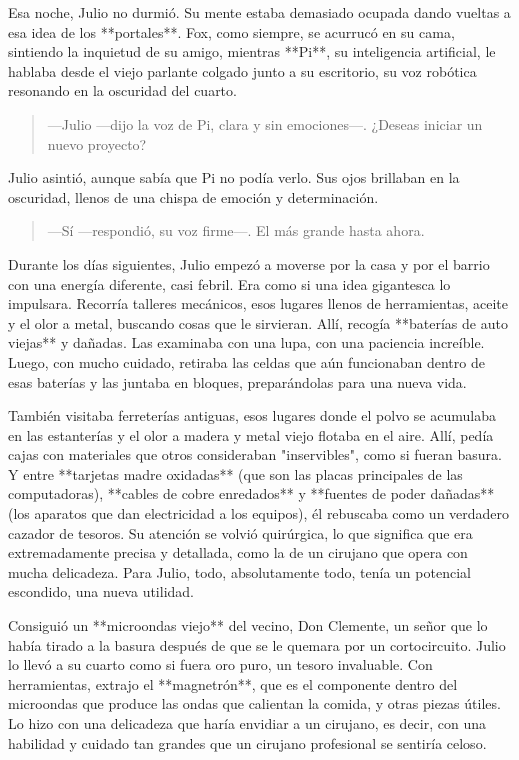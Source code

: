 \documentclass[a4paper,12pt]{book}
\begin{document}
Esa noche, Julio no durmió. Su mente estaba demasiado ocupada dando vueltas a esa idea de los **portales**. Fox, como siempre, se acurrucó en su cama, sintiendo la inquietud de su amigo, mientras **Pi**, su inteligencia artificial, le hablaba desde el viejo parlante colgado junto a su escritorio, su voz robótica resonando en la oscuridad del cuarto.

\begin{quote}
    —Julio —dijo la voz de Pi, clara y sin emociones—. ¿Deseas iniciar un nuevo proyecto?
\end{quote}

Julio asintió, aunque sabía que Pi no podía verlo. Sus ojos brillaban en la oscuridad, llenos de una chispa de emoción y determinación.

\begin{quote}
    —Sí —respondió, su voz firme—. El más grande hasta ahora.
\end{quote}

Durante los días siguientes, Julio empezó a moverse por la casa y por el barrio con una energía diferente, casi febril. Era como si una idea gigantesca lo impulsara. Recorría talleres mecánicos, esos lugares llenos de herramientas, aceite y el olor a metal, buscando cosas que le sirvieran. Allí, recogía **baterías de auto viejas** y dañadas. Las examinaba con una lupa, con una paciencia increíble. Luego, con mucho cuidado, retiraba las celdas que aún funcionaban dentro de esas baterías y las juntaba en bloques, preparándolas para una nueva vida.

También visitaba ferreterías antiguas, esos lugares donde el polvo se acumulaba en las estanterías y el olor a madera y metal viejo flotaba en el aire. Allí, pedía cajas con materiales que otros consideraban "inservibles", como si fueran basura. Y entre **tarjetas madre oxidadas** (que son las placas principales de las computadoras), **cables de cobre enredados** y **fuentes de poder dañadas** (los aparatos que dan electricidad a los equipos), él rebuscaba como un verdadero cazador de tesoros. Su atención se volvió quirúrgica, lo que significa que era extremadamente precisa y detallada, como la de un cirujano que opera con mucha delicadeza. Para Julio, todo, absolutamente todo, tenía un potencial escondido, una nueva utilidad.

Consiguió un **microondas viejo** del vecino, Don Clemente, un señor que lo había tirado a la basura después de que se le quemara por un cortocircuito. Julio lo llevó a su cuarto como si fuera oro puro, un tesoro invaluable. Con herramientas, extrajo el **magnetrón**, que es el componente dentro del microondas que produce las ondas que calientan la comida, y otras piezas útiles. Lo hizo con una delicadeza que haría envidiar a un cirujano, es decir, con una habilidad y cuidado tan grandes que un cirujano profesional se sentiría celoso.
\end{document}
